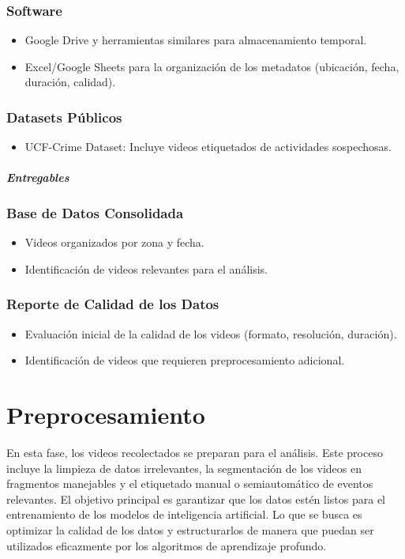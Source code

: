 \documentclass[listof=nochaptergap,12pt,times,authoryear]{report}
\begin{document}
\subsubsection{Software}
\begin{itemize}
    \item Google Drive y herramientas similares para almacenamiento temporal.
    \item Excel/Google Sheets para la organización de los metadatos (ubicación, fecha, duración, calidad).
\end{itemize}

\subsubsection{Datasets Públicos}
\begin{itemize}
    \item UCF-Crime Dataset: Incluye videos etiquetados de actividades sospechosas.
\end{itemize}

\paragraph{\textit{Entregables}}

\subsubsection{Base de Datos Consolidada}
\begin{itemize}
    \item Videos organizados por zona y fecha.
    \item Identificación de videos relevantes para el análisis.
\end{itemize}

\subsubsection{Reporte de Calidad de los Datos}
\begin{itemize}
    \item Evaluación inicial de la calidad de los videos (formato, resolución, duración).
    \item Identificación de videos que requieren preprocesamiento adicional.
\end{itemize}



\section{Preprocesamiento}
En esta fase, los videos recolectados se preparan para el análisis. Este proceso incluye la limpieza de datos irrelevantes, la segmentación de los videos en fragmentos manejables y el etiquetado manual o semiautomático de eventos relevantes. El objetivo principal es garantizar que los datos estén listos para el entrenamiento de los modelos de inteligencia artificial.
Lo que se busca es optimizar la calidad de los datos y estructurarlos de manera que puedan ser utilizados eficazmente por los algoritmos de aprendizaje profundo.
\end{document}
